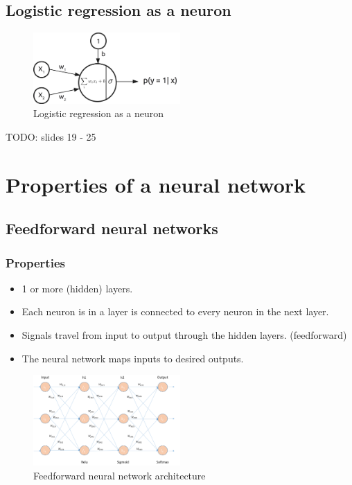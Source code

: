 \documentclass{article}
\begin{document}
\subsection{Logistic regression as a neuron}

\begin{figure}[H]
    \centering
    \includegraphics[width=0.5\textwidth]{logistic-regression-neuron.png}
    \caption{Logistic regression as a neuron}
\end{figure}



TODO: slides 19 - 25

\section{Properties of a neural network}

\subsection{Feedforward neural networks}

\subsubsection{Properties}

\begin{itemize}
    \item 1 or more (hidden) layers.
    \item Each neuron is in a layer is connected to every neuron in the next layer.
    \item Signals travel from input to output through the hidden layers. (feedforward)
    \item The neural network maps inputs to desired outputs.
\end{itemize}


\begin{figure}[H]
    \centering
    \includegraphics[width=0.5\textwidth]{feedforward-neural-network-properties.png}
    \caption{Feedforward neural network architecture}
\end{figure}
\end{document}
